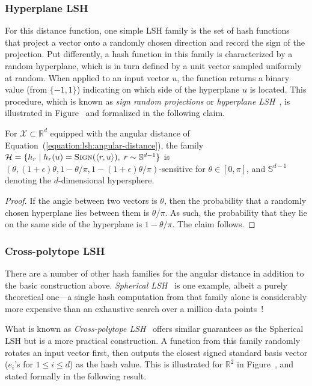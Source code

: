 \subsubsection{Hyperplane LSH}
For this distance function, one simple LSH family is the set
of hash functions that project a vector
onto a randomly chosen direction and record the sign of the projection.
Put differently, a hash function in this family
is characterized by a random hyperplane, which is in turn defined by a unit vector
sampled uniformly at random. When applied to an input vector $u$,
the function returns a binary value (from $\{ -1, 1\}$) indicating on which
side of the hyperplane $u$ is located. This procedure, which is known as \emph{sign random projections}
or \emph{hyperplane LSH}~\citep{charikar2002rounding-algorithms},
is illustrated in Figure~ and
formalized in the following claim.

\begin{theorem}
    For $\mathcal{X} \subset \mathbb{R}^d$ equipped with the angular distance of
    Equation~(\ref{equation:lsh:angular-distance}),
    the family $\mathcal{H} = \{ h_r \;|\; h_r(u) = \textsc{Sign}(\langle r, u \rangle), \; r \sim \mathbb{S}^{d - 1} \}$
    is $(\theta, (1 + \epsilon)\theta, 1 - \theta/\pi, 1 - (1+\epsilon)\theta/\pi)$-sensitive
    for $\theta \in [0, \pi]$, and $\mathbb{S}^{d-1}$ denoting the $d$-dimensional hypersphere.
\end{theorem}
\begin{proof}
    If the angle between two vectors is $\theta$, then the probability that a randomly
    chosen hyperplane lies between them is $\theta / \pi$. As such, the probability that
    they lie on the same side of the hyperplane is $1 - \theta / \pi$. The claim follows.
\end{proof}

\subsubsection{Cross-polytope LSH}
There are a number of other hash families for the angular distance in addition to the basic
construction above. \emph{Spherical LSH}~\citep{andoni2014beyond} is one example, albeit a purely
theoretical one---a single hash computation from that family alone is considerably more expensive
than an exhaustive search over a million data points~\citep{andoni2015cross-polytope-lsh}!

What is known as \emph{Cross-polytope LSH}~\citep{andoni2015cross-polytope-lsh,terasawa2007spherical-lsh}
offers similar guarantees as the Spherical LSH but is a more practical construction.
A function from this family randomly rotates an input vector first, then outputs the closest
signed standard basis vector ($e_i$'s for $1 \leq i \leq d$) as the hash value.
This is illustrated for $\mathbb{R}^2$ in Figure~,
and stated formally in the following result.


